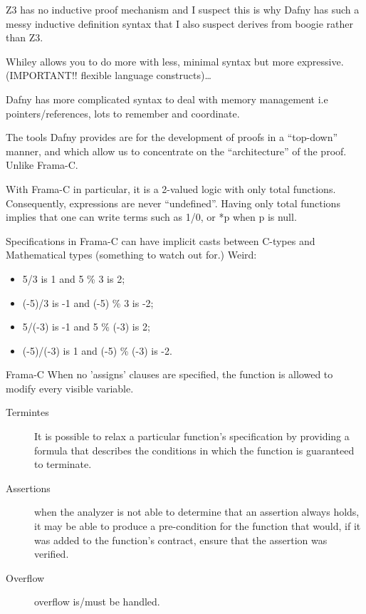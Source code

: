 \documentclass[10pt]{article} %
\begin{document}
Z3 has no inductive proof mechanism and I suspect this is why Dafny has such a messy inductive definition syntax that I also suspect derives from boogie rather than Z3.

Whiley allows you to do more with less, minimal syntax but more expressive. (IMPORTANT!! flexible language constructs)… 

Dafny has more complicated syntax to deal with memory management i.e pointers\slash references, lots to remember and coordinate.

The tools Dafny provides are for the development of proofs in a “top-down” manner, and which allow us to concentrate on the “architecture” of the proof. Unlike Frama-C.

With Frama-C in particular, it is a 2-valued logic with only total functions. Consequently, expressions are never “undefined”. Having only total functions implies that one can write terms such as 1\slash 0, or *p when p is null.


Specifications in Frama-C can have implicit casts between C-types and Mathematical types (something to watch out for.)
Weird:

\begin{itemize}
\item 5\slash 3 is 1 and 5 \% 3 is 2;
\item (-5)\slash 3 is -1 and (-5) \% 3 is -2;
\item 5\slash (-3) is -1 and 5 \% (-3) is 2;
\item (-5)\slash (-3) is 1 and (-5) \% (-3) is -2.
\end{itemize}

Frama-C When no 'assigns' clauses are specified, the function is allowed to modify every visible variable.
\begin{description}
\item[Termintes]It is possible to relax a particular function’s specification by providing a formula that describes the conditions in which the function is guaranteed to terminate. 
\item[Assertions]when the analyzer is not able to determine that an assertion always holds, it may be able to produce a pre-condition for the function that would, if it was added to the function’s contract, ensure that the assertion was verified. 
\item[Overflow] overflow is\slash must be handled.
\end{description}

\end{document}
